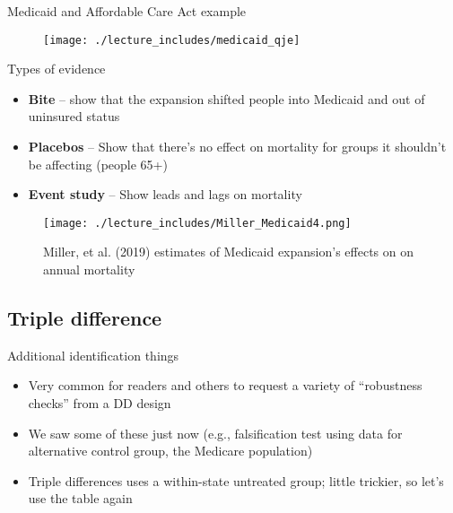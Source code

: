 \documentclass{beamer}
\begin{document}
\begin{frame}{Medicaid and Affordable Care Act example}

\begin{figure}
\texttt{[image: ./lecture\_includes/medicaid\_qje]}
\end{figure}

\end{frame}

\begin{frame}{Types of evidence}

\begin{itemize}
\item \textbf{Bite} -- show that the expansion shifted people into Medicaid and out of uninsured status
\item \textbf{Placebos} -- Show that there's no effect on mortality for groups it shouldn't be affecting (people 65+)
\item \textbf{Event study} -- Show leads and lags on mortality
\end{itemize}

\end{frame}







\begin{frame}[plain]

	\begin{figure}
	\texttt{[image: ./lecture\_includes/Miller\_Medicaid4.png]}
	\caption{Miller, et al. (2019) estimates of Medicaid expansion's effects on on annual mortality}
	\end{figure}

\end{frame}

\subsection{Triple difference}

\begin{frame}{Additional identification things}
	
	\begin{itemize}
	\item Very common for readers and others to request a variety of ``robustness checks'' from a DD design
	\item We saw some of these just now (e.g., falsification test using data for alternative control group, the Medicare population)
	\item Triple differences uses a within-state untreated group; little trickier, so let's use the table again
	\end{itemize}
\end{frame}
\end{document}
